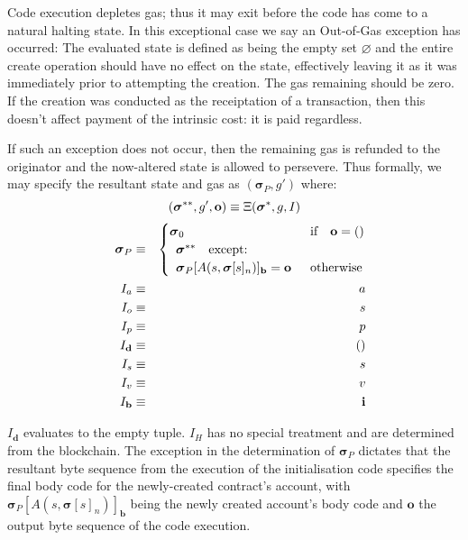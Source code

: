 \documentclass[9pt,oneside]{amsart}
\begin{document}
\begin{multicols}{2}
Code execution depletes gas; thus it may exit before the code has come to a natural halting state. In this exceptional case we say an Out-of-Gas exception has occurred: The evaluated state is defined as being the empty set $\varnothing$ and the entire create operation should have no effect on the state, effectively leaving it as it was immediately prior to attempting the creation. The gas remaining should be zero. If the creation was conducted as the receiptation of a transaction, then this doesn't affect payment of the intrinsic cost: it is paid regardless.

If such an exception does not occur, then the remaining gas is refunded to the originator and the now-altered state is allowed to persevere. Thus formally, we may specify the resultant state and gas as $(\boldsymbol{\sigma}_P, g')$ where:
\begin{equation}
(\boldsymbol{\sigma}^{**}, g', \mathbf{o}) \equiv \Xi(\boldsymbol{\sigma}^*, g, I) \\
\end{equation}
\begin{eqnarray}
\quad \boldsymbol{\sigma}_P & \equiv & \begin{cases}
\boldsymbol{\sigma}_0 & \text{if} \quad \mathbf{o} = () \\
\begin{array}[b]{l}
\boldsymbol{\sigma}^{**} \quad \text{except:} \\
\boldsymbol{\sigma}_P[A(s, \boldsymbol{\sigma}[s]_n)]_{\mathbf{b}} = \mathbf{o}
\end{array} & \text{otherwise}
\end{cases} \\
I_a & \equiv & a \\
I_o & \equiv & s \\
I_p & \equiv & p \\
I_\mathbf{d} & \equiv & () \\
I_s & \equiv & s \\
I_v & \equiv & v \\
I_\mathbf{b} & \equiv & \mathbf{i}
\end{eqnarray}

$I_\mathbf{d}$ evaluates to the empty tuple. $I_H$ has no special treatment and are determined from the blockchain. The exception in the determination of $\boldsymbol{\sigma}_P$ dictates that the resultant byte sequence from the execution of the initialisation code specifies the final body code for the newly-created contract's account, with $\boldsymbol{\sigma}_P[A(s, \boldsymbol{\sigma}[s]_n)]_{\mathbf{b}}$ being the newly created account's body code and $\mathbf{o}$ the output byte sequence of the code execution.


\end{multicols}
\end{document}
